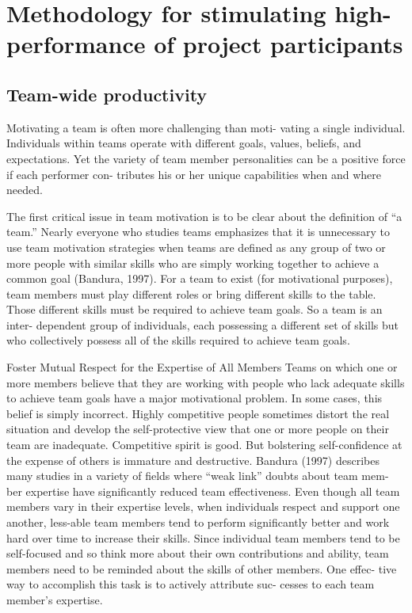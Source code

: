 \chapter{Methodology for stimulating high-performance of project participants}

\section{Team-wide productivity}

Motivating a team is often more challenging than moti- vating a single individual. Individuals within teams
operate with different goals, values, beliefs, and expectations. Yet the variety of team member personalities can be a positive force if each performer con- tributes his or her unique capabilities when and where needed.

The first critical issue in team motivation is to be clear about the definition of “a team.” Nearly everyone who studies teams emphasizes that it is unnecessary to use team motivation strategies when teams are defined as any group of two or more people with similar skills who are simply working together to achieve a common goal (Bandura, 1997). For a team to exist (for motivational purposes), team members must play different roles or bring different skills to the table. Those different skills must be required to achieve team goals. So a team is an inter- dependent group of individuals, each possessing a different set of skills but who collectively possess all of the skills required to achieve team goals.

Foster Mutual Respect for the Expertise of All Members
Teams on which one or more members believe that they are working with people who lack adequate skills to achieve team goals have a major motivational problem. In some cases, this belief is simply incorrect. Highly competitive people sometimes distort the real situation and develop the self-protective view that one or more people on their team are inadequate. Competitive spirit is good. But bolstering self-confidence at the expense of others is immature and destructive. Bandura (1997) describes many studies in a variety of fields where “weak link” doubts about team mem- ber expertise have significantly reduced team effectiveness. Even though all team members vary in their expertise levels, when individuals respect and support one another, less-able team members tend to perform significantly better and work hard over time to increase their skills. Since individual team members tend to be self-focused and so think more about their own contributions and ability, team members need to be reminded about the skills of other members. One effec- tive way to accomplish this task is to actively attribute suc- cesses to each team member’s expertise.

